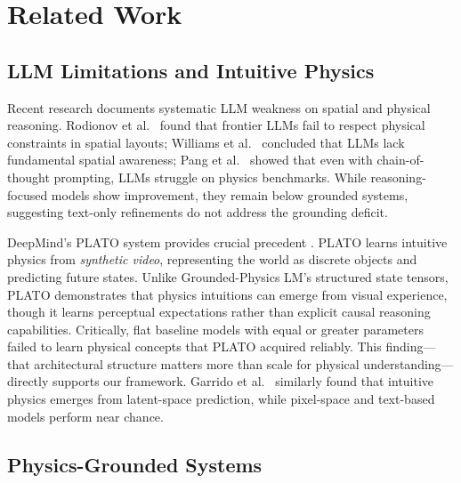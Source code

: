 \documentclass[conference]{IEEEtran}
\theoremstyle{plain}
\theoremstyle{definition}
\theoremstyle{remark}
\begin{document}
\section{Related Work}
\label{sec:related}

\subsection{LLM Limitations and Intuitive Physics}

Recent research documents systematic LLM weakness on spatial and physical reasoning. Rodionov et al.\ \cite{rodionov2025floorplanqa} found that frontier LLMs fail to respect physical constraints in spatial layouts; Williams et al.\ \cite{williams2024easy} concluded that LLMs lack fundamental spatial awareness; Pang et al.\ \cite{pang2024physics} showed that even with chain-of-thought prompting, LLMs struggle on physics benchmarks. While reasoning-focused models show improvement, they remain below grounded systems, suggesting text-only refinements do not address the grounding deficit.

DeepMind's PLATO system provides crucial precedent \cite{piloto2022intuitive}. PLATO learns intuitive physics from \textit{synthetic video}, representing the world as discrete objects and predicting future states. Unlike Grounded-Physics LM's structured state tensors, PLATO demonstrates that physics intuitions can emerge from visual experience, though it learns perceptual expectations rather than explicit causal reasoning capabilities. Critically, flat baseline models with equal or greater parameters failed to learn physical concepts that PLATO acquired reliably. This finding---that architectural structure matters more than scale for physical understanding---directly supports our framework. Garrido et al.\ \cite{garrido2025intuitive} similarly found that intuitive physics emerges from latent-space prediction, while pixel-space and text-based models perform near chance.

\subsection{Physics-Grounded Systems}

\end{document}
